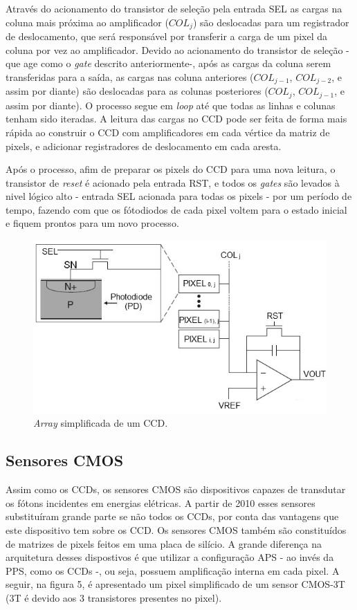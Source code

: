 \documentclass[10pt,a4paper,twocolumn]{article}
\begin{document}
	Através do acionamento do transistor de seleção pela entrada SEL as cargas na coluna mais próxima ao amplificador ($COL_{j}$) são deslocadas para um registrador de deslocamento, que será responsável por transferir a carga de um pixel da coluna por vez ao amplificador. Devido ao acionamento do transistor de seleção - que age como o \textit{gate} descrito anteriormente-, após as cargas da coluna serem transferidas para a saída, as cargas nas coluna anteriores ($COL_{j-1}$, $COL_{j-2}$, e assim por diante) são deslocadas para as colunas posteriores ($COL_{j}$, $COL_{j-1}$, e assim por diante). O processo segue em \textit{loop} até que todas as linhas e colunas tenham sido iteradas. A leitura das cargas no CCD pode ser feita de forma mais rápida ao construir o CCD com amplificadores em cada vértice da matriz de pixels, e adicionar registradores de deslocamento em cada aresta.
	
	Após o processo, afim de preparar os pixels do CCD para uma nova leitura, o transistor de \textit{reset} é acionado pela entrada RST, e todos os \textit{gates} são levados à nivel lógico alto - entrada SEL acionada para todas os pixels - por um período de tempo, fazendo com que os fótodiodos de cada pixel voltem para o estado inicial e fiquem prontos para um novo processo.

	\begin{figure}[H]
		\centering
		\includegraphics[scale=0.56]{imagens/passive-pixel.jpg}
		\caption{\textit{Array} simplificada de um CCD.}
	\end{figure}
	
	\subsection*{Sensores CMOS}
	Assim  como os CCDs, os sensores CMOS são dispositivos capazes de transdutar os fótons incidentes em energias elétricas. A partir de 2010 esses sensores substituíram grande parte se não todos os CCDs, por conta das vantagens que este dispositivo tem sobre os CCD. Os sensores CMOS também são constituídos de matrizes de pixels feitos em uma placa de silício. A grande diferença na arquitetura desses dispostivos é que utilizar a configuração APS - ao invés da PPS, como os CCDs -, ou seja, possuem amplificação interna em cada pixel. A seguir, na figura 5, é apresentado um pixel simplificado de um sensor CMOS-3T (3T é devido aos 3 transistores presentes no pixel).
	
\end{document}
